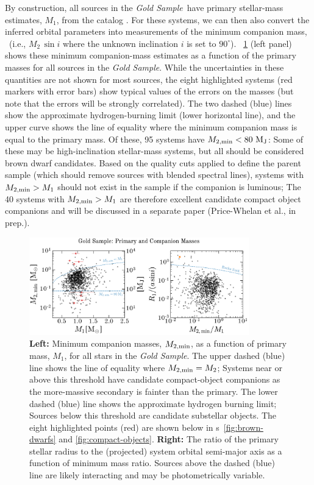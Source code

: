 \documentclass[modern]{aastex63}
\newcommand{\goldsample}{\textit{Gold Sample}}
\begin{document}
By construction, all sources in the \goldsample\ have primary stellar-mass
estimates, $M_1$, from the  catalog \citep{Queiroz:2019}.
For these systems, we can then also convert the inferred orbital parameters into
measurements of the minimum companion mass, \mtwomin\ (i.e., $M_2 \, \sin i$
where the unknown inclination $i$ is set to $90^\circ$).
\figurename~\ref{fig:m2m1} (left panel) shows these minimum companion-mass
estimates as a function of the  primary masses for all
sources in the \goldsample.
While the uncertainties in these quantities are not shown for most sources, the
eight highlighted systems (red markers with error bars) show typical values of
the errors on the masses (but note that the errors will be strongly correlated).
The two dashed (blue) lines show the approximate hydrogen-burning limit (lower
horizontal line), and the upper curve shows the line of equality where the
minimum companion mass is equal to the primary mass.
Of these, 95 systems have $M_{2, {\rm min}} < 80~\mathrm{M}_{\mathrm{J}}$: Some of these may be
high-inclination stellar-mass systems, but all should be considered brown dwarf
candidates.
Based on the quality cuts applied to define the parent sample (which should
remove sources with blended spectral lines), systems with $M_{2, {\rm min}} > M_1$
should not exist in the sample if the companion is luminous; The 40 systems with
$M_{2, {\rm min}} > M_1$ are therefore excellent candidate compact object companions and
will be discussed in a separate paper (Price-Whelan et al., in prep.).

\begin{figure}[t]
    \begin{center}
    \includegraphics[width=0.85\textwidth]{m2_m1_roche.pdf}
    \end{center}
    \caption{%
    \textbf{Left:} Minimum companion masses, $M_{2, {\rm min}}$, as a function of
    primary mass, $M_1$, for all stars in the \goldsample.
    The upper dashed (blue) line shows the line of equality where $M_{2, {\rm min}} =
    M_2$; Systems near or above this threshold have candidate compact-object
    companions as the more-massive secondary is fainter than the primary.
    The lower dashed (blue) line shows the approximate hydrogen burning limit;
    Sources below this threshold are candidate substellar objects.
    The eight highlighted points (red) are shown below in \figurename
    s~\ref{fig:brown-dwarfs} and \ref{fig:compact-objects}.
    \textbf{Right:} The ratio of the primary stellar radius to the (projected)
    system orbital semi-major axis as a function of minimum mass ratio.
    Sources above the dashed (blue) line are likely interacting and may be
    photometrically variable.
    \label{fig:m2m1}
    }
\end{figure}
\end{document}

